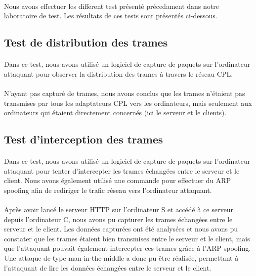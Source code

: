 \documentclass[a4paper,twocolumn]{report}
\begin{document}
\paragraph{}Nous avons effectuer les different test présenté précedament dans notre laboratoire de test. Les résultats de ces tests sont présentés ci-dessous.

\subsection{Test de distribution des trames}
\paragraph{}Dans ce test, nous avons utilisé un logiciel de capture de paquets sur l'ordinateur attaquant pour observer la distribution des trames à travers le réseau CPL. 
\paragraph{}N'ayant pas capturé de trames, nous avons conclus que les trames n'étaient pas transmises par tous les adaptateurs CPL vers les ordinateurs, mais seulement aux ordinateurs qui étaient directement concernés (ici le serveur et le clients).

\subsection{Test d'interception des trames}
\paragraph{}Dans ce test, nous avons utilisé un logiciel de capture de paquets sur l'ordinateur attaquant pour tenter d'intercepter les trames échangées entre le serveur et le client. Nous avons également utilisé une commande pour effectuer du ARP spoofing afin de rediriger le trafic réseau vers l'ordinateur attaquant.
\paragraph{}Après avoir lancé le serveur HTTP sur l'ordinateur S et accédé à ce serveur depuis l'ordinateur C, nous avons pu capturer les trames échangées entre le serveur et le client. Les données capturées ont été analysées et nous avons pu constater que les trames étaient bien transmises entre le serveur et le client, mais que l'attaquant pouvait également intercepter ces trames grâce à l'ARP spoofing. Une attaque de type man-in-the-middle a donc pu être réalisée, permettant à l'attaquant de lire les données échangées entre le serveur et le client.
\end{document}
